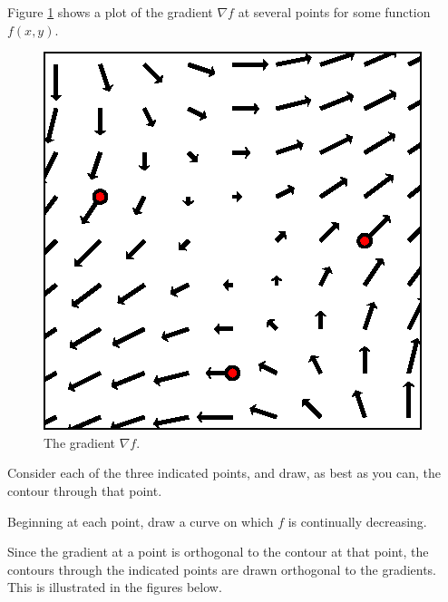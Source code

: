 \begin{exercises}
\begin{exerciseSolution}
  \ea
\end{exerciseSolution}

\item Figure \ref{F:10.6.gradient.field} shows a plot of the gradient
  $\nabla f$ at several points for some function $f(x,y)$.

  \begin{figure}[ht]
    \begin{center}
     \includegraphics{figures/fig_10_6_gradient_field.eps}
    \end{center}	
    \caption{The gradient $\nabla f$.}
    \label{F:10.6.gradient.field}
  \end{figure}

  \ba
\item Consider each of the three indicated points, and draw, as best
  as you can, the contour through that point.

\item Beginning at each point, draw a curve on which $f$ is continually
  decreasing. 

  \ea

\begin{exerciseSolution}
  \ba
\item Since the gradient at a point is orthogonal to the contour at that point, the contours through the indicated points are drawn orthogonal to the gradients. This is illustrated in the figures below.


\end{exerciseSolution}
\end{exercises}
